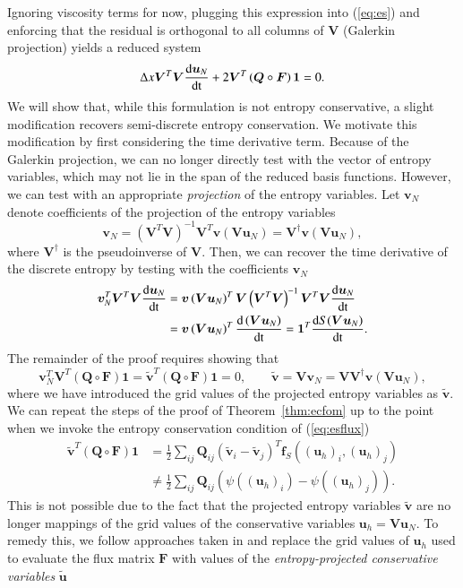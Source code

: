 \documentclass[preprint,10pt]{elsarticle}
\theoremstyle{definition}
\theoremstyle{lemma}
\theoremstyle{theorem}
\theoremstyle{assumption}
\renewcommand{\tilde}{\widetilde}
\newcommand{\td}[2]{\frac{{\rm d}#1}{{\rm d}{\rm #2}}}
\newcommand{\LRp}[1]{\left( #1 \right)}
\begin{document}
Ignoring viscosity terms for now, plugging this expression into (\ref{eq:es}) and enforcing that the residual is orthogonal to all columns of $\bm{V}$ (Galerkin projection) yields a reduced system
\begin{align*}
\Delta x\bm{V}^T\bm{V}\td{\bm{u}_N}{t} + 2\bm{V}^T\LRp{\bm{Q}\circ \bm{F}}\bm{1} = 0.
\end{align*}
We will show that, while this formulation is not entropy conservative, a slight modification recovers semi-discrete entropy conservation.  We motivate this modification by first considering the time derivative term.  Because of the Galerkin projection, we can no longer directly test with the vector of entropy variables, which may not lie  in the span of the reduced basis functions.  However, we can test with an appropriate \textit{projection} of the entropy variables.  Let $\bm{v}_N$ denote coefficients of the projection of the entropy variables
\[
\bm{v}_N = \LRp{\bm{V}^T\bm{V}}^{-1}\bm{V}^T \bm{v}\LRp{\bm{V}\bm{u}_N} = \bm{V}^{\dagger} \bm{v}\LRp{\bm{V}\bm{u}_N},
\]
where $\bm{V}^{\dagger}$ is the pseudoinverse of $\bm{V}$.  Then, we can recover the time derivative of the discrete entropy by testing with the coefficients $\bm{v}_N$
\begin{align}
\bm{v}_N^T\bm{V}^T\bm{V}\td{\bm{u}_N}{t} &= \bm{v}\LRp{\bm{V}\bm{u}_N}^T \bm{V}\LRp{\bm{V}^T\bm{V}}^{-1}\bm{V}^T\bm{V} \td{\bm{u}_N}{t} \label{eq:esromtime}\\
&= 
 \bm{v}\LRp{\bm{V}\bm{u}_N}^T \td{\LRp{\bm{V}\bm{u}_N}}{t} = \bm{1}^T\td{S(\bm{V}\bm{u}_N)}{t}.\nonumber
\end{align}
The remainder of the proof requires showing that 
\[
\bm{v}_N^T\bm{V}^T\LRp{\bm{Q}\circ \bm{F}}\bm{1} = \tilde{\bm{v}}^T\LRp{\bm{Q}\circ \bm{F}}\bm{1}  = 0, \qquad \tilde{\bm{v}} = \bm{V}\bm{v}_N = \bm{V}\bm{V}^{\dagger} \bm{v}\LRp{\bm{V}\bm{u}_N},
\]
where we have introduced the grid values of the projected entropy variables as $\tilde{\bm{v}}$.
We can repeat the steps of the proof of Theorem~\ref{thm:ecfom} up to the point when we invoke the entropy conservation condition of (\ref{eq:esflux})
\begin{align*}
\tilde{\bm{v}}^T\LRp{{\bm{Q}}\circ \bm{F}}\bm{1} &= \frac{1}{2}\sum_{ij} \bm{Q}_{ij} \LRp{\tilde{\bm{v}}_i-\tilde{\bm{v}}_j}^T \bm{f}_{S}\LRp{\LRp{\bm{u}_h}_i, \LRp{\bm{u}_h}_j}\\
&\neq \frac{1}{2}\sum_{ij} \bm{Q}_{ij} \LRp{ \psi((\bm{u}_h)_i)- \psi((\bm{u}_h)_j)}.
\end{align*}
This is not possible due to the fact that the projected entropy variables $\tilde{\bm{v}}$ are no longer mappings of the grid values of the conservative variables $\bm{u}_h = \bm{V}\bm{u}_N$.  To remedy this, we follow approaches taken in \cite{parsani2016entropy, chan2017discretely} and replace the grid values of ${\bm{u}_h}$ used to evaluate the flux matrix $\bm{F}$ with values of the \textit{entropy-projected conservative variables} $\tilde{\bm{u}}$
\end{document}
